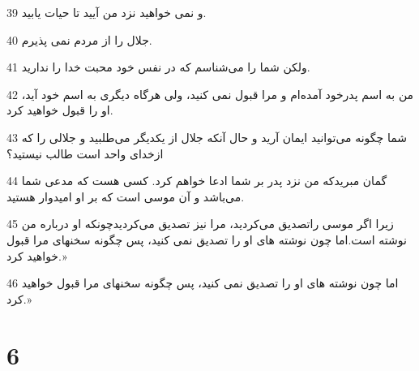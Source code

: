 \par 39 و نمی خواهید نزد من آیید تا حیات یابید.
\par 40 جلال را از مردم نمی پذیرم.
\par 41 ولکن شما را می‌شناسم که در نفس خود محبت خدا را ندارید.
\par 42 من به اسم پدرخود آمده‌ام و مرا قبول نمی کنید، ولی هرگاه دیگری به اسم خود آید، او را قبول خواهید کرد.
\par 43 شما چگونه می‌توانید ایمان آرید و حال آنکه جلال از یکدیگر می‌طلبید و جلالی را که ازخدای واحد است طالب نیستید؟
\par 44 گمان مبریدکه من نزد پدر بر شما ادعا خواهم کرد. کسی هست که مدعی شما می‌باشد و آن موسی است که بر او امیدوار هستید.
\par 45 زیرا اگر موسی راتصدیق می‌کردید، مرا نیز تصدیق می‌کردیدچونکه او درباره من نوشته است.اما چون نوشته های او را تصدیق نمی کنید، پس چگونه سخنهای مرا قبول خواهید کرد.»
\par 46 اما چون نوشته های او را تصدیق نمی کنید، پس چگونه سخنهای مرا قبول خواهید کرد.»

\chapter{6}

